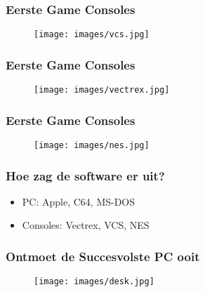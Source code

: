 \documentclass[aspectratio=43]{uva-inf-presentation}
\begin{document}

\begin{frame}
\frametitle{Eerste Game Consoles}

\begin{figure}
\texttt{[image: images/vcs.jpg]}
\end{figure}

\end{frame}


\begin{frame}
\frametitle{Eerste Game Consoles}

\begin{figure}
\texttt{[image: images/vectrex.jpg]}
\end{figure}

\end{frame}


\begin{frame}
\frametitle{Eerste Game Consoles}

\begin{figure}
\texttt{[image: images/nes.jpg]}
\end{figure}

\end{frame}


\begin{frame}
\frametitle{Hoe zag de software er uit?}

\begin{itemize}
\item PC: Apple, C64, MS-DOS
\item Consoles: Vectrex, VCS, NES
\end{itemize}

\end{frame}


\begin{frame}
\frametitle{Ontmoet de Succesvolste PC ooit}

\begin{figure}
\texttt{[image: images/desk.jpg]}
\end{figure}

\end{frame}
\end{document}
